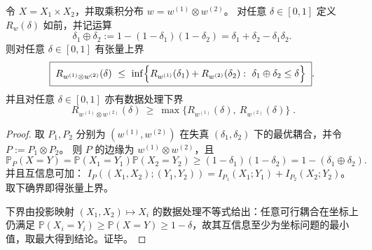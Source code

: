 \begin{theorem}\label{thm:pom-diagonal-rate-tensor-upper-bound}
令 \(X=X_1\times X_2\)，并取乘积分布 \(w=w^{(1)}\otimes w^{(2)}\)。
对任意 \(\delta\in[0,1]\) 定义 \(R_w(\delta)\) 如前，并记运算
\[
\delta_1\oplus\delta_2:=1-(1-\delta_1)(1-\delta_2)=\delta_1+\delta_2-\delta_1\delta_2.
\]
则对任意 \(\delta\in[0,1]\) 有张量上界
\[
\boxed{\;
R_{w^{(1)}\otimes w^{(2)}}(\delta)\ \le\
\inf\Bigl\{R_{w^{(1)}}(\delta_1)+R_{w^{(2)}}(\delta_2):\ \delta_1\oplus\delta_2\le \delta\Bigr\}\; }.
\]
并且对任意 \(\delta\in[0,1]\) 亦有数据处理下界
\[
\boxed{\;
R_{w^{(1)}\otimes w^{(2)}}(\delta)\ \ge\ \max\bigl\{R_{w^{(1)}}(\delta),\ R_{w^{(2)}}(\delta)\bigr\}\; }.
\]
\end{theorem}
\begin{proof}
取 \(P_1,P_2\) 分别为 \((w^{(1)},w^{(2)})\) 在失真 \((\delta_1,\delta_2)\) 下的最优耦合，并令 \(P:=P_1\otimes P_2\)。
则 \(P\) 的边缘为 \(w^{(1)}\otimes w^{(2)}\)，且
\[
\mathbb P_P(X=Y)=\mathbb P(X_1=Y_1)\mathbb P(X_2=Y_2)\ge (1-\delta_1)(1-\delta_2)=1-(\delta_1\oplus\delta_2).
\]
并且互信息可加：
\(
I_P((X_1,X_2);(Y_1,Y_2))=I_{P_1}(X_1;Y_1)+I_{P_2}(X_2;Y_2)
\)。
取下确界即得张量上界。
\par
下界由投影映射 \((X_1,X_2)\mapsto X_i\) 的数据处理不等式给出：任意可行耦合在坐标上仍满足
\(
\mathbb P(X_i=Y_i)\ge \mathbb P(X=Y)\ge 1-\delta
\)，故其互信息至少为坐标问题的最小值，取最大得到结论。证毕。
\end{proof}
